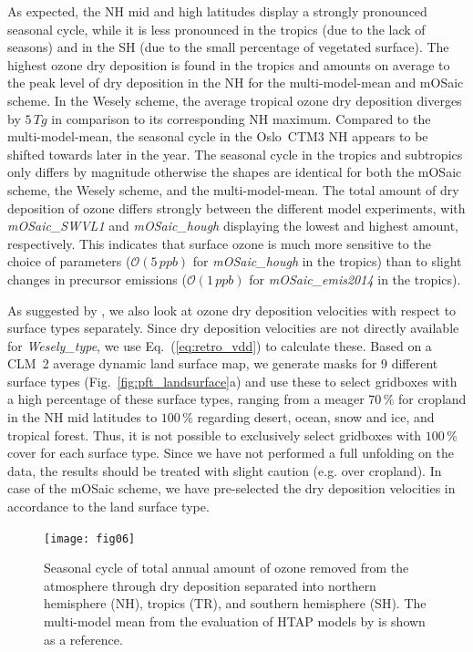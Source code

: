 \documentclass[gmd, manuscript]{copernicus}
\begin{document}
As expected, the NH mid and high latitudes display a strongly pronounced seasonal cycle, while it is less pronounced in the tropics (due to the lack of seasons) and in the SH (due to the small percentage of vegetated surface). The highest ozone dry deposition is found in the tropics and amounts on average to the  peak level of dry deposition in the NH for the multi-model-mean \citep{ACP:Hardacre2015} and mOSaic scheme. In the Wesely scheme, the average tropical ozone dry deposition diverges by $5\,\unit{Tg}$ in comparison to its corresponding NH maximum. Compared to the multi-model-mean, the seasonal cycle in the Oslo~CTM3 NH appears to be shifted towards later in the year. The seasonal cycle in the tropics and subtropics only differs by magnitude otherwise the shapes are identical for both the mOSaic scheme, the Wesely scheme, and the multi-model-mean. The total amount of dry deposition of ozone differs strongly between the different model experiments, with \emph{mOSaic\_SWVL1} and \emph{mOSaic\_hough} displaying the lowest and highest amount, respectively. This indicates that surface ozone is much more sensitive to the choice of parameters ($\mathcal{O}(5\,\unit{ppb})$ for \emph{mOSaic\_hough} in the tropics) than to slight changes in precursor emissions ($\mathcal{O}(1\,\unit{ppb})$ for \emph{mOSaic\_emis2014} in the tropics).

As suggested by \citet{ACP:Hardacre2015}, we also look at ozone dry deposition velocities with respect to surface types separately. Since dry deposition velocities are not directly available for \emph{Wesely\_type}, we use Eq.~(\ref{eq:retro_vdd}) to calculate these. Based on a CLM~2 average dynamic land surface map, we generate masks for 9 different surface types (Fig.~\ref{fig:pft_landsurface}a) and use these to select gridboxes with a high percentage of these surface types, ranging from a meager $70\,\unit{\%}$ for cropland in the NH mid latitudes to $100\,\unit{\%}$ regarding desert, ocean, snow and ice, and tropical forest. Thus, it is not possible to exclusively select gridboxes with $100\,\unit{\%}$ cover for each surface type. Since we have not performed a full unfolding on the data, the results should be treated with slight caution (e.g. over cropland). In case of the mOSaic scheme, we have pre-selected the dry deposition velocities in accordance to the land surface type.
%
\begin{figure}[t]
  \texttt{[image: fig06]}
  \caption{Seasonal cycle of total annual amount of ozone removed from the atmosphere through dry deposition separated into northern hemisphere (NH), tropics (TR), and southern hemisphere (SH). The multi-model mean from the evaluation of HTAP models by \citet{ACP:Hardacre2015} is shown as a reference.}
  \label{fig:mmm_drydep_hem}
\end{figure}
%
\end{document}
